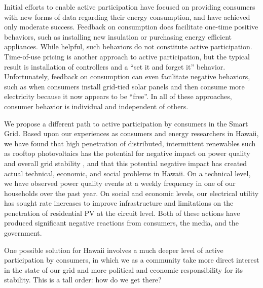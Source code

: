 Initial efforts to enable active participation have focused on providing consumers with new forms of data regarding their energy consumption, and have achieved only moderate success.  Feedback on consumption does facilitate one-time positive behaviors, such as installing new insulation or purchasing energy efficient appliances. While helpful, such behaviors do not constitute active participation.    Time-of-use pricing is another approach to active participation, but the typical result is installation of controllers and a ``set it and forget it'' behavior.  Unfortunately, feedback on consumption can even facilitate negative behaviors, such as when consumers install grid-tied solar panels and then consume more electricity because it now appears to be ``free''.  In all of these approaches, consumer behavior is individual and independent of others. 

We propose a different path to active participation by consumers in the Smart Grid.  Based upon our experiences as consumers and energy researchers in Hawaii, we have found that high penetration of distributed, intermittent renewables such as rooftop photovoltaics has the potential for negative impact on power quality and overall grid stability \cite{Rodriguez2010,Laskar2012}, and that this potential negative impact has created actual technical, economic, and social problems in Hawaii.  On a technical level, we have observed power quality events at a weekly frequency in one of our households over the past year. On social and economic levels, our electrical utility has sought rate increases to improve infrastructure and limitations on the penetration of residential PV at the circuit level. Both of these actions have produced significant negative reactions from consumers, the media, and the government. 

One possible solution for Hawaii involves a much deeper level of active participation by consumers, in which we as a community take more direct interest in the state of our grid and more political and economic responsibility for its stability.  This is a tall order: how do we get there?

